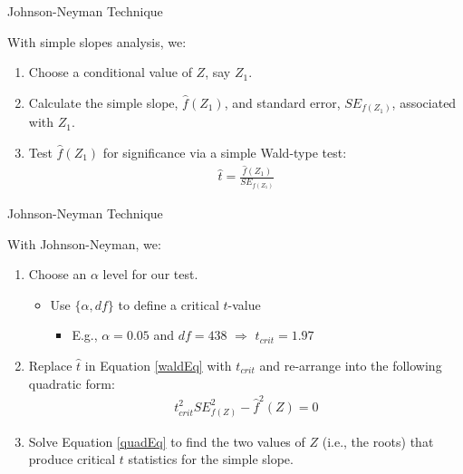 \documentclass{beamer}\usepackage[]{graphicx}\usepackage[]{color}
\begin{document}

\begin{frame}{Johnson-Neyman Technique}
  
  With simple slopes analysis, we:
  \vb
  \begin{enumerate}
    \item Choose a conditional value of $Z$, say $Z_1$.
      \vb
    \item Calculate the simple slope, $\hat{f}(Z_1)$, and standard error, 
      $SE_{f(Z_1)}$, associated with $Z_1$.
      \vb
    \item Test $\hat{f}(Z_1)$ for significance via a simple Wald-type test:
      \begin{align}
        \hat{t} = \frac{\hat{f}(Z_1)}{SE_{f(Z_1)}} \label{waldEq}
      \end{align}
  \end{enumerate}

\end{frame}


\begin{frame}{Johnson-Neyman Technique}
  
  With Johnson-Neyman, we:
  \vb
  \begin{enumerate}
  \item Choose an $\alpha$ level for our test.
    \begin{itemize}
    \item Use $\{\alpha, df\}$ to define a critical $t$-value
      \begin{itemize}
      \item E.g., $\alpha = 0.05$ and $df = 438$ $\Rightarrow$ $t_{crit} = 1.97$
      \end{itemize}
    \end{itemize}
    \vb
  \item Replace $\hat{t}$ in Equation \ref{waldEq} with $t_{crit}$ and re-arrange 
    into the following quadratic form:
    \begin{align}
      t_{crit}^2 SE_{f(Z)}^2 - \hat{f}^2(Z) = 0 \label{quadEq}
    \end{align}
  \item Solve Equation \ref{quadEq} to find the two values of $Z$ (i.e., the 
    roots) that produce critical $t$ statistics for the simple slope.
  \end{enumerate}
  
\end{frame}
\end{document}
